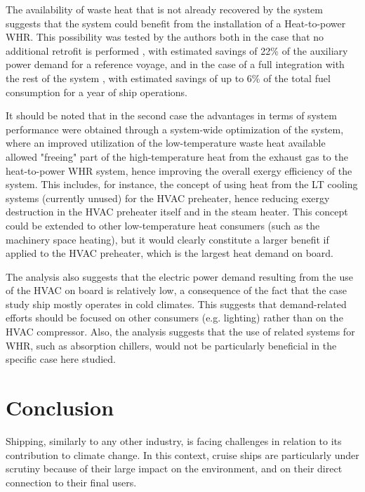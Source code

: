 \documentclass[preprint,12pt]{elsarticle}
\begin{document}
The availability of waste heat that is not already recovered by the system suggests that the system could benefit from the installation of a Heat-to-power WHR. This possibility was tested by the authors both in the case that no additional retrofit is performed \cite{Ahlgren2016,Mondejar2017}, with estimated savings of 22\% of the auxiliary power demand for a reference voyage, and in the case of a full integration with the rest of the system \cite{Baldi2017}, with estimated savings of up to 6\% of the total fuel consumption for a year of ship operations. 

It should be noted that in the second case the advantages in terms of system performance were obtained through a system-wide optimization of the system, where an improved utilization of the low-temperature waste heat available allowed "freeing" part of the high-temperature heat from the exhaust gas to the heat-to-power WHR system, hence improving the overall exergy efficiency of the system. This includes, for instance, the concept of using heat from the LT cooling systems (currently unused) for the HVAC preheater, hence reducing exergy destruction in the HVAC preheater itself and in the steam heater. This concept could be extended to other low-temperature heat consumers (such as the machinery space heating), but it would clearly constitute a larger benefit if applied to the HVAC preheater, which is the largest heat demand on board. 

The analysis also suggests that the electric power demand resulting from the use of the HVAC on board is relatively low, a consequence of the fact that the case study ship mostly operates in cold climates. This suggests that demand-related efforts should be focused on other consumers (e.g. lighting) rather than on the HVAC compressor. Also, the analysis suggests that the use of related systems for WHR, such as absorption chillers, would not be particularly beneficial in the specific case here studied. 



\section{Conclusion} \label{sec:conclusion}

Shipping, similarly to any other industry, is facing challenges in relation to its contribution to climate change. In this context, cruise ships are particularly under scrutiny because of their large impact on the environment, and on their direct connection to their final users. 
\end{document}
